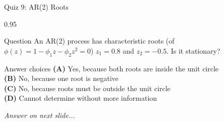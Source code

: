 \documentclass[9pt, aspectratio=169, t]{beamer}
\begin{document}
\begin{frame}{Quiz 9: AR(2) Roots}
    \begin{cminipage}{0.95\textwidth}
    \begin{alertblock}{Question}
        An AR(2) process has characteristic roots (of $\phi(z) = 1 - \phi_1 z - \phi_2 z^2 = 0$) $z_1 = 0.8$ and $z_2 = -0.5$. Is it stationary?
    \end{alertblock}

    \vspace{0.4cm}

    \begin{block}{Answer choices}
        \textcolor{MainBlue}{\textbf{(A)}} Yes, because both roots are inside the unit circle\\[3pt]
        \textcolor{MainBlue}{\textbf{(B)}} No, because one root is negative\\[3pt]
        \textcolor{MainBlue}{\textbf{(C)}} No, because roots must be outside the unit circle\\[3pt]
        \textcolor{MainBlue}{\textbf{(D)}} Cannot determine without more information
    \end{block}

    \vspace{0.5cm}

    \begin{center}
        \textit{Answer on next slide...}
    \end{center}
    \end{cminipage}
\end{frame}
\end{document}
